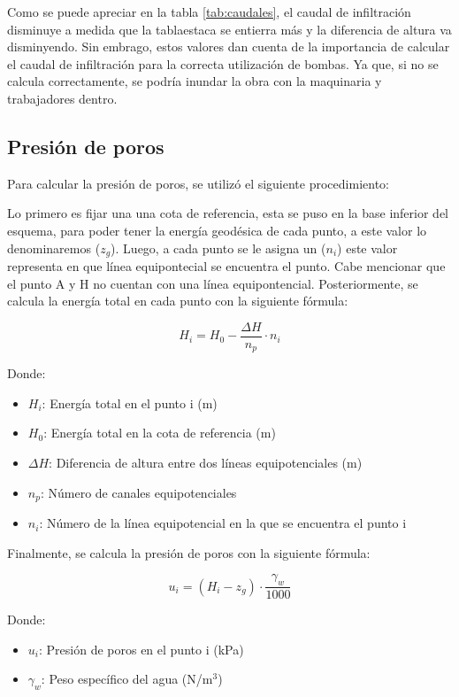 \documentclass{article}
\begin{document}
Como se puede apreciar en la tabla \ref{tab:caudales}, el caudal de infiltración disminuye a medida que la tablaestaca se entierra más y la diferencia de altura va disminyendo. Sin embrago, estos valores dan cuenta de la importancia de calcular el caudal de infiltración para la correcta utilización de bombas. Ya que, si no se calcula correctamente, se podría inundar la obra con la maquinaria y trabajadores dentro.

\subsection{Presión de poros}
Para calcular la presión de poros, se utilizó el siguiente procedimiento:

Lo primero es fijar una una cota de referencia, esta se puso en la base inferior del esquema, para poder tener la energía geodésica de cada punto, a este valor lo denominaremos ($z_g$). Luego, a cada punto se le asigna un ($n_i$) este valor representa en que línea equipontecial se encuentra el punto. Cabe mencionar que el punto A y H no cuentan con una línea equipontencial. Posteriormente, se calcula la energía total en cada punto con la siguiente fórmula:

\begin{equation}
  H_i = H_0 - \frac{\Delta H}{n_p} \cdot n_i
\end{equation}

Donde:
\begin{itemize}
    \item $H_i$: Energía total en el punto i (m)
    \item $H_0$: Energía total en la cota de referencia (m)
    \item $\Delta H$: Diferencia de altura entre dos líneas equipotenciales (m)
    \item $n_p$: Número de canales equipotenciales
    \item $n_i$: Número de la línea equipotencial en la que se encuentra el punto i
\end{itemize}

Finalmente, se calcula la presión de poros con la siguiente fórmula:

\begin{equation}
  u_i =  (H_i - z_g)\cdot \frac{\gamma_w}{1000}
\end{equation}

Donde:
\begin{itemize}
    \item $u_i$: Presión de poros en el punto i (kPa)
    \item $\gamma_w$: Peso específico del agua (N/m$^3$)
\end{itemize}
\end{document}
